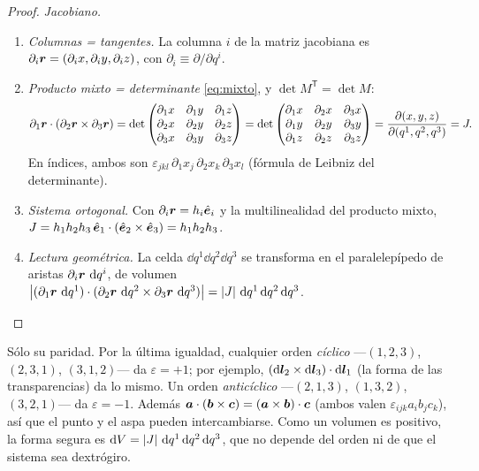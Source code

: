 \begin{proof}
\noindent\emph{Jacobiano.}
\begin{enumerate}
  \item \emph{Columnas = tangentes.} La columna $i$ de la matriz jacobiana es
  $\partial_{i}\bm{r}=(\partial_{i}x,\partial_{i}y,\partial_{i}z)$, con
  $\partial_{i}\equiv\partial/\partial q^{i}$.
  \item \emph{Producto mixto = determinante} \eqref{eq:mixto}, y
  $\det M^{\mathsf T}=\det M$:
  \[
    \partial_{1}\bm{r}\cdot(\partial_{2}\bm{r}\times\partial_{3}\bm{r})
    =\det\begin{pmatrix}\partial_{1}x&\partial_{1}y&\partial_{1}z\\
    \partial_{2}x&\partial_{2}y&\partial_{2}z\\
    \partial_{3}x&\partial_{3}y&\partial_{3}z\end{pmatrix}
    =\det\begin{pmatrix}\partial_{1}x&\partial_{2}x&\partial_{3}x\\
    \partial_{1}y&\partial_{2}y&\partial_{3}y\\
    \partial_{1}z&\partial_{2}z&\partial_{3}z\end{pmatrix}
    =\frac{\partial(x,y,z)}{\partial(q^{1},q^{2},q^{3})}=J .
  \]
  En índices, ambos son $\varepsilon_{jkl}\,\partial_{1}x_{j}\,\partial_{2}x_{k}\,\partial_{3}x_{l}$
  (fórmula de Leibniz del determinante).
  \item \emph{Sistema ortogonal.} Con $\partial_{i}\bm{r}=h_{i}\hat{\bm{e}}_{i}$ y la
  multilinealidad del producto mixto,
  $J=h_{1}h_{2}h_{3}\,\hat{\bm{e}}_{1}\cdot(\hat{\bm{e}}_{2}\times\hat{\bm{e}}_{3})=h_{1}h_{2}h_{3}$.
  \item \emph{Lectura geométrica.} La celda $\dd q^{1}\dd q^{2}\dd q^{3}$ se
  transforma en el paralelepípedo de aristas $\partial_{i}\bm{r}\,\mathop{}\!\mathrm{d} q^{i}$, de
  volumen $\left\lvert (\partial_{1}\bm{r}\,\mathop{}\!\mathrm{d} q^{1})\cdot(\partial_{2}\bm{r}\,\mathop{}\!\mathrm{d} q^{2}\times\partial_{3}\bm{r}\,\mathop{}\!\mathrm{d} q^{3})\right\rvert
  =\left\lvert J\right\rvert\,\mathop{}\!\mathrm{d} q^{1}\mathop{}\!\mathrm{d} q^{2}\mathop{}\!\mathrm{d} q^{3}$.\qedhere
\end{enumerate}
\end{proof}

\begin{observacion}
Sólo su paridad. Por la última igualdad, cualquier orden \emph{cíclico}
—$(1,2,3)$, $(2,3,1)$, $(3,1,2)$— da $\varepsilon=+1$; por ejemplo,
$(\mathop{}\!\mathrm{d}\bm{l}_{2}\times\mathop{}\!\mathrm{d}\bm{l}_{3})\cdot\mathop{}\!\mathrm{d}\bm{l}_{1}$ (la forma de las
transparencias) da lo mismo. Un orden \emph{anticíclico} —$(2,1,3)$,
$(1,3,2)$, $(3,2,1)$— da $\varepsilon=-1$. Además
$\bm{a}\cdot(\bm{b}\times\bm{c})=(\bm{a}\times\bm{b})\cdot\bm{c}$ (ambos valen
$\varepsilon_{ijk}a_{i}b_{j}c_{k}$), así que el punto y el aspa pueden
intercambiarse. Como un volumen es positivo, la forma segura es
$\mathop{}\!\mathrm{d} V=\left\lvert J\right\rvert\,\mathop{}\!\mathrm{d} q^{1}\mathop{}\!\mathrm{d} q^{2}\mathop{}\!\mathrm{d} q^{3}$, que no depende del orden ni de que
el sistema sea dextrógiro.
\end{observacion}

